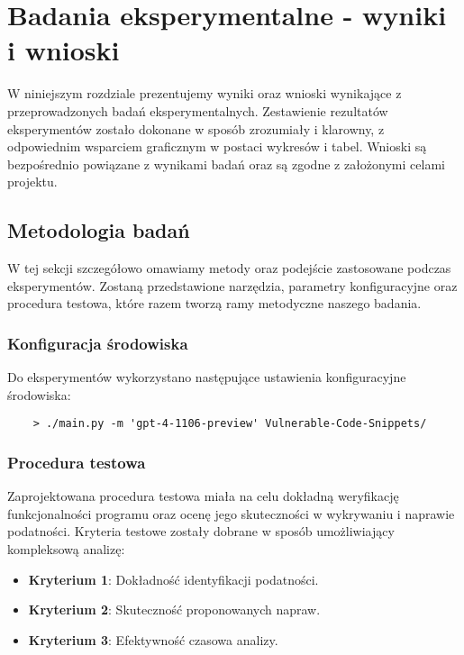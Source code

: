 \chapter{Badania eksperymentalne - wyniki i wnioski}
\label{ch:badania_eksperymentalne}

W niniejszym rozdziale prezentujemy wyniki oraz wnioski wynikające z przeprowadzonych badań eksperymentalnych. Zestawienie rezultatów eksperymentów zostało dokonane w sposób zrozumiały i klarowny, z odpowiednim wsparciem graficznym w postaci wykresów i tabel. Wnioski są bezpośrednio powiązane z wynikami badań oraz są zgodne z założonymi celami projektu.

\section{Metodologia badań}
\label{sec:metodologia_badan}

W tej sekcji szczegółowo omawiamy metody oraz podejście zastosowane podczas eksperymentów. Zostaną przedstawione narzędzia, parametry konfiguracyjne oraz procedura testowa, które razem tworzą ramy metodyczne naszego badania.

\subsection{Konfiguracja środowiska}
\label{subsec:konfiguracja_srodowiska}

Do eksperymentów wykorzystano następujące ustawienia konfiguracyjne środowiska:
\begin{verbatim}
    > ./main.py -m 'gpt-4-1106-preview' Vulnerable-Code-Snippets/
\end{verbatim}

\subsection{Procedura testowa}
\label{subsec:procedura_testowa}

Zaprojektowana procedura testowa miała na celu dokładną weryfikację funkcjonalności programu oraz ocenę jego skuteczności w wykrywaniu i naprawie podatności. Kryteria testowe zostały dobrane w sposób umożliwiający kompleksową analizę:
\begin{itemize}
    \item \textbf{Kryterium 1}: Dokładność identyfikacji podatności.
    \item \textbf{Kryterium 2}: Skuteczność proponowanych napraw.
    \item \textbf{Kryterium 3}: Efektywność czasowa analizy.
\end{itemize}

